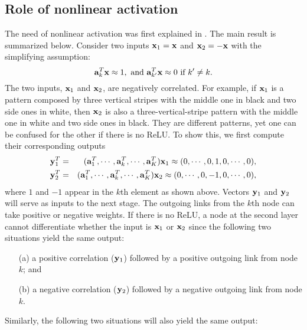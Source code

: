 \documentclass[preprint,12pt]{elsarticle}
\begin{document}
\subsection{Role of nonlinear activation}

The need of nonlinear activation was first explained in
\cite{kuo2016understanding}. The main result is summarized below.
Consider two inputs ${\bf x}_1={\bf x}$ and ${\bf x}_2=-{\bf x}$ with
the simplifying assumption:
\begin{equation}\label{eq:simplifying}
{\bf a}_k^T {\bf x} \approx 1, \mbox{   and   } 
{\bf a}_{k'}^T {\bf x} \approx 0 \mbox{ if } k' \ne k.
\end{equation}
The two inputs, ${\bf x}_1$ and ${\bf x}_2$, are negatively correlated.
For example, if ${\bf x}_1$ is a pattern composed by three vertical
stripes with the middle one in black and two side ones in white, then
${\bf x}_2$ is also a three-vertical-stripe pattern with the middle one
in white and two side ones in black. They are different patterns, yet
one can be confused for the other if there is no ReLU. To show this, we
first compute their corresponding outputs
\begin{eqnarray}\label{eq:outputs}
{\bf y}_1^T & = & ({\bf a}_1^T, \cdots, {\bf a}_k^T, \cdots, 
{\bf a}_K^T){\bf x}_1 \approx (0, \cdots, 0, 1, 0, \cdots, 0),  \\
{\bf y}_2^T & = & ({\bf a}_1^T, \cdots, {\bf a}_k^T, \cdots, 
{\bf a}_K^T){\bf x}_2 \approx (0, \cdots, 0, -1, 0, \cdots, 0),
\end{eqnarray}
where $1$ and $-1$ appear in the $k$th element as shown above.  Vectors
${\bf y}_1$ and ${\bf y}_2$ will serve as inputs to the next
stage. The outgoing links from the $k$th node can take positive or
negative weights. If there is no ReLU, a node at the second layer cannot
differentiate whether the input is ${\bf x}_1$ or ${\bf x}_2$ since the
following two situations yield the same output: \vspace{-1ex}
\begin{itemize}
\setlength{\itemsep}{-2pt}
\item[(a)] a positive correlation (${\bf y}_1$) followed by a positive
outgoing link from node $k$; and
\item[(b)] a negative correlation (${\bf y}_2$) followed by a negative
outgoing link from node $k$. 
\end{itemize}
\vspace{-1ex}
Similarly, the following two situations will also yield the same output:
\vspace{-1ex}
\end{document}
